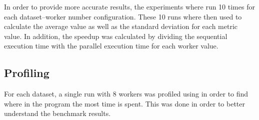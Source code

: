 In order to provide more accurate results, the experiments where run 10 times for each dataset--worker number configuration. These 10 runs where then used to calculate the
average value as well as the standard deviation for each metric value. In addition, the speedup was calculated by dividing the sequential execution time with the parallel execution
time for each worker value.

\subsection{Profiling}
For each dataset, a single run with 8 workers was profiled using  in order to find where in the program the most time is spent. This was done in order
to better understand the benchmark results.
